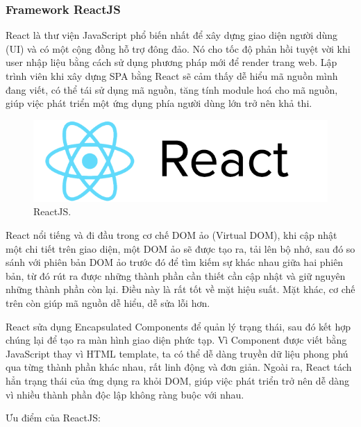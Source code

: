 \subsubsection{Framework ReactJS}
React là thư viện JavaScript phổ biến nhất để xây dựng giao diện người dùng (UI) và có một cộng đồng hỗ trợ đông
đảo. Nó cho tốc độ phản hồi tuyệt vời khi user nhập liệu bằng cách sử dụng phương pháp mới để render trang web. Lập trình viên khi xây dựng SPA bằng React sẽ cảm thấy dễ hiểu mã nguồn mình đang viết, có thể tái sử dụng mã nguồn, tăng tính module hoá cho mã nguồn, giúp việc phát triển một ứng dụng phía người dùng lớn trở nên khả thi. \par
\begin{figure}[H]
    \begin{center}
        \includegraphics[width=12cm]{Image/Technical/react_logo.png}
        \caption{ReactJS.}
        \label{reactjs}
    \end{center}
\end{figure}
React nổi tiếng và đi đầu trong cơ chế DOM ảo (Virtual DOM), khi cập nhật một chi tiết trên giao diện, một DOM ảo sẽ được tạo ra, tải lên bộ nhớ, sau đó so sánh với phiên bản DOM ảo trước đó để tìm kiếm sự khác nhau giữa hai phiên bản, từ đó rút ra được những thành phần cần thiết cần cập nhật và giữ nguyên những thành phần còn lại. Điều này là rất tốt về mặt hiệu suất. Mặt khác, cơ chế trên còn giúp mã nguồn dễ hiểu, dễ sửa lỗi hơn. \par
React sửa dụng Encapsulated Components để quản lý trạng thái, sau đó kết hợp chúng lại để tạo ra màn hình giao diện phức tạp. Vì Component được viết bằng JavaScript thay vì HTML template, ta có thể dễ dàng truyền dữ liệu phong phú qua từng thành phần khác nhau, rất linh động và đơn giản. Ngoài ra, React tách hẳn trạng thái của ứng dụng ra khỏi DOM, giúp việc phát triển trở nên dễ dàng vì nhiều thành phần độc lập không ràng buộc với nhau.\par
Ưu điểm của ReactJS:
